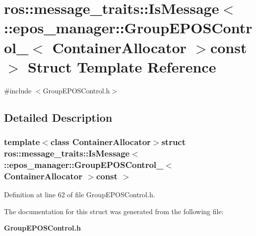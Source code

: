 \section{ros\-:\-:message\-\_\-traits\-:\-:\-Is\-Message$<$ \-:\-:epos\-\_\-manager\-:\-:\-Group\-E\-P\-O\-S\-Control\-\_\-$<$ \-Container\-Allocator $>$const $>$ \-Struct \-Template \-Reference}
\label{structros_1_1message__traits_1_1IsMessage_3_01_1_1epos__manager_1_1GroupEPOSControl___3_01ContainerAllocator_01_4const_01_01_4}


{\ttfamily \#include $<$\-Group\-E\-P\-O\-S\-Control.\-h$>$}



\subsection{\-Detailed \-Description}
\subsubsection*{template$<$class Container\-Allocator$>$struct ros\-::message\-\_\-traits\-::\-Is\-Message$<$ \-::epos\-\_\-manager\-::\-Group\-E\-P\-O\-S\-Control\-\_\-$<$ Container\-Allocator $>$const  $>$}



\-Definition at line 62 of file \-Group\-E\-P\-O\-S\-Control.\-h.



\-The documentation for this struct was generated from the following file\-:\begin{DoxyCompactItemize}
\item 
{\bf \-Group\-E\-P\-O\-S\-Control.\-h}\end{DoxyCompactItemize}
